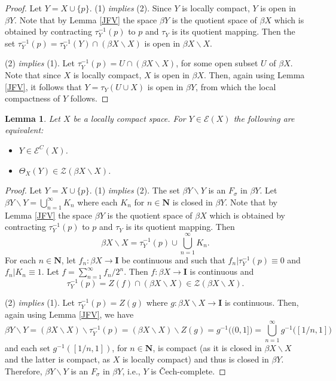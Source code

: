 \documentclass{amsart}
\newtheorem{lemma}[theorem]{Lemma}
\theoremstyle{definition}
\theoremstyle{remark}
\theoremstyle{notation}
\numberwithin{equation}{section}
\begin{document}
\begin{proof}
Let $Y=X\cup\{p\}$. (1) {\em  implies} (2). Since $Y$ is locally compact, $Y$ is  open in $\beta Y$. Note that by Lemma \ref{JFV} the space $\beta Y$ is the quotient space of $\beta X$ which is obtained by contracting $\tau^{-1}_Y(p)$ to $p$ and $\tau_Y$ is its quotient mapping. Then the set $\tau^{-1}_Y(p)=\tau^{-1}_Y(Y)\cap (\beta X\backslash X)$ is open in $\beta X\backslash X$.

(2) {\em  implies} (1).  Let $\tau^{-1}_Y(p)=U\cap (\beta X\backslash X)$, for some open subset $U$ of $\beta X$. Note that since $X$ is locally compact, $X$ is open in $\beta X$. Then, again using Lemma \ref{JFV}, it follows that $Y=\tau_Y(U\cup X)$ is open in $\beta Y$, from which the local compactness of $Y$ follows.
\end{proof}

\begin{lemma}\label{HDJYYH}
Let $X$ be a locally compact  space. For $Y\in{\mathscr E}(X)$ the following are equivalent:
\begin{itemize}
\item[\rm(1)] $Y\in{\mathscr E}^C(X)$.
\item[\rm(2)] $\Theta_X(Y)\in {\mathscr Z}(\beta X\backslash X)$.
\end{itemize}
\end{lemma}

\begin{proof}
Let $Y=X\cup\{p\}$. (1) {\em  implies} (2).  The set $\beta Y\backslash Y$ is an
$F_\sigma$ in $\beta Y$. Let $\beta Y\backslash Y=\bigcup_{n=1}^\infty K_n$ where each $K_n$ for $n\in\mathbf{N}$ is closed in $\beta Y$. Note that by Lemma \ref{JFV} the space $\beta Y$ is the quotient space of $\beta X$ which is obtained by contracting $\tau^{-1}_Y(p)$ to $p$ and $\tau_Y$ is its quotient mapping. Then
\[\beta X\backslash X=\tau^{-1}_Y(p)\cup\bigcup_{n=1}^\infty K_n.\]
For each  $n\in \mathbf{N}$, let  $f_n:\beta X\rightarrow \mathbf{I}$ be continuous and  such that $f_n|\tau^{-1}_Y(p)\equiv 0$ and $f_n|K_n\equiv 1$. Let $f=\sum_{n=1}^\infty f_n/2^n$. Then $f:\beta X\rightarrow \mathbf{I}$ is continuous and
\[\tau^{-1}_Y(p)=Z(f)\cap(\beta X\backslash X)\in{\mathscr Z}(\beta X\backslash X).\]

(2) {\em  implies} (1).  Let  $\tau^{-1}_Y(p)=Z(g)$ where  $g:\beta X\backslash X\rightarrow \mathbf{I}$ is continuous. Then, again using  Lemma \ref{JFV}, we have
\[\beta Y\backslash Y=(\beta X\backslash X)\backslash\tau^{-1}_Y(p)=(\beta X\backslash X)\backslash Z(g)=g^{-1}\big((0,1]\big)=\bigcup_{n=1}^\infty g^{-1}\big([1/n,1]\big)\]
and  each  set $g^{-1}([1/n,1])$, for $n\in \mathbf{N}$, is compact (as it is closed in $\beta X\backslash X$ and the latter is compact, as $X$  is locally compact) and thus is closed in $\beta Y$.  Therefore, $\beta Y\backslash Y$ is an $F_\sigma$ in $\beta Y$, i.e., $Y$ is \v{C}ech-complete.
\end{proof}
\end{document}
